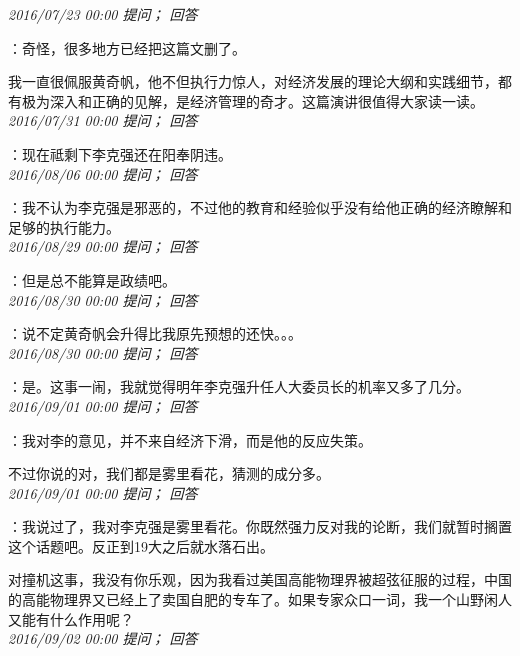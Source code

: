 \documentclass[twocolumn]{ctexart}
\begin{document}
\textit{\hfill\noindent\small 2016/07/23 00:00 提问； 回答}

：奇怪，很多地方已经把这篇文删了。

我一直很佩服黄奇帆，他不但执行力惊人，对经济发展的理论大纲和实践细节，都有极为深入和正确的见解，是经济管理的奇才。这篇演讲很值得大家读一读。\\

\textit{\hfill\noindent\small 2016/07/31 00:00 提问； 回答}

：现在祗剩下李克强还在阳奉阴违。\\

\textit{\hfill\noindent\small 2016/08/06 00:00 提问； 回答}

：我不认为李克强是邪恶的，不过他的教育和经验似乎没有给他正确的经济瞭解和足够的执行能力。\\

\textit{\hfill\noindent\small 2016/08/29 00:00 提问； 回答}

：但是总不能算是政绩吧。\\

\textit{\hfill\noindent\small 2016/08/30 00:00 提问； 回答}

：说不定黄奇帆会升得比我原先预想的还快。。。\\

\textit{\hfill\noindent\small 2016/08/30 00:00 提问； 回答}

：是。这事一闹，我就觉得明年李克强升任人大委员长的机率又多了几分。\\

\textit{\hfill\noindent\small 2016/09/01 00:00 提问； 回答}

：我对李的意见，并不来自经济下滑，而是他的反应失策。

不过你说的对，我们都是雾里看花，猜测的成分多。\\

\textit{\hfill\noindent\small 2016/09/01 00:00 提问； 回答}

：我说过了，我对李克强是雾里看花。你既然强力反对我的论断，我们就暂时搁置这个话题吧。反正到19大之后就水落石出。

对撞机这事，我没有你乐观，因为我看过美国高能物理界被超弦征服的过程，中国的高能物理界又已经上了卖国自肥的专车了。如果专家众口一词，我一个山野闲人又能有什么作用呢？\\

\textit{\hfill\noindent\small 2016/09/02 00:00 提问； 回答}
\end{document}

